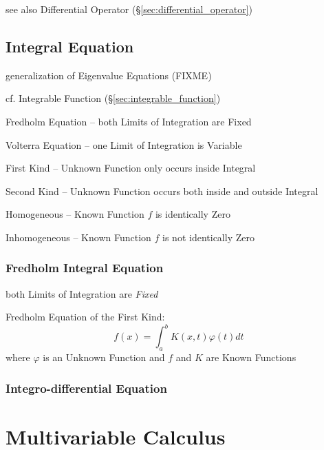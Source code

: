 \fist see also Differential Operator (\S\ref{sec:differential_operator})



\subsection{Integral Equation}\label{sec:integral_equation}

generalization of Eigenvalue Equations (FIXME)

cf. Integrable Function (\S\ref{sec:integrable_function})

Fredholm Equation -- both Limits of Integration are Fixed

Volterra Equation -- one Limit of Integration is Variable

First Kind -- Unknown Function only occurs inside Integral

Second Kind -- Unknown Function occurs both inside and outside Integral

Homogeneous -- Known Function $f$ is identically Zero

Inhomogeneous -- Known Function $f$ is not identically Zero



\subsubsection{Fredholm Integral Equation}\label{sec:fredholm_integral}

both Limits of Integration are \emph{Fixed}

Fredholm Equation of the First Kind:
\[
  f(x) = \int_a^b K(x,t) \varphi(t) dt
\]
where $\varphi$ is an Unknown Function and $f$ and $K$ are Known Functions



\subsubsection{Integro-differential Equation}\label{sec:integro_differential}



\section{Multivariable Calculus}\label{sec:multivariable_calculus}

